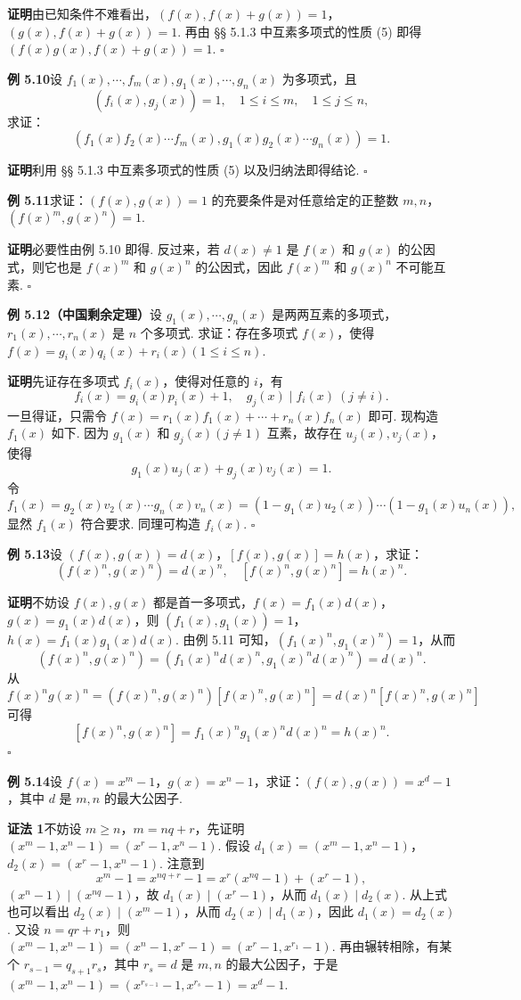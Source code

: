 \documentclass[UTF8,12pt,a4paper,fontset=fandol]{ctexart}
\begin{document}
\noindent\textbf{证明}\quad 由已知条件不难看出，$(f(x),f(x)+g(x))=1$，$(g(x),f(x)+g(x))=1$. 再由 §§ 5.1.3 中互素多项式的性质 (5) 即得 $(f(x)g(x),f(x)+g(x))=1$. \hfill $\square$

\noindent\textbf{例 5.10}\quad 设 $f_1(x),\cdots,f_m(x),g_1(x),\cdots,g_n(x)$ 为多项式，且
\[
(f_i(x),g_j(x))=1,\quad 1\le i\le m,\quad 1\le j\le n,
\]
求证：
\[
(f_1(x)f_2(x)\cdots f_m(x),g_1(x)g_2(x)\cdots g_n(x))=1.
\]

\noindent\textbf{证明}\quad 利用 §§ 5.1.3 中互素多项式的性质 (5) 以及归纳法即得结论. \hfill $\square$

\noindent\textbf{例 5.11}\quad 求证：$(f(x),g(x))=1$ 的充要条件是对任意给定的正整数 $m,n$，$(f(x)^m,g(x)^n)=1$.

\noindent\textbf{证明}\quad 必要性由例 5.10 即得. 反过来，若 $d(x)\ne1$ 是 $f(x)$ 和 $g(x)$ 的公因式，则它也是 $f(x)^m$ 和 $g(x)^n$ 的公因式，因此 $f(x)^m$ 和 $g(x)^n$ 不可能互素. \hfill $\square$

\noindent\textbf{例 5.12（中国剩余定理）}\quad 设 $g_1(x),\cdots,g_n(x)$ 是两两互素的多项式，$r_1(x),\cdots,r_n(x)$ 是 $n$ 个多项式. 求证：存在多项式 $f(x)$，使得 $f(x)=g_i(x)q_i(x)+r_i(x)(1\le i\le n)$.

\noindent\textbf{证明}\quad 先证存在多项式 $f_i(x)$，使得对任意的 $i$，有
\[
f_i(x)=g_i(x)p_i(x)+1,\quad g_j(x)\mid f_i(x)\ (j\ne i).
\]
一旦得证，只需令 $f(x)=r_1(x)f_1(x)+\cdots+r_n(x)f_n(x)$ 即可. 现构造 $f_1(x)$ 如下. 因为 $g_1(x)$ 和 $g_j(x)(j\ne1)$ 互素，故存在 $u_j(x),v_j(x)$，使得
\[
g_1(x)u_j(x)+g_j(x)v_j(x)=1.
\]
令
\[
f_1(x)=g_2(x)v_2(x)\cdots g_n(x)v_n(x)
=(1-g_1(x)u_2(x))\cdots(1-g_1(x)u_n(x)),
\]
显然 $f_1(x)$ 符合要求. 同理可构造 $f_i(x)$. \hfill $\square$

\noindent\textbf{例 5.13}\quad 设 $(f(x),g(x))=d(x)$，$[f(x),g(x)]=h(x)$，求证：
\[
(f(x)^n,g(x)^n)=d(x)^n,\quad [f(x)^n,g(x)^n]=h(x)^n.
\]

\noindent\textbf{证明}\quad 不妨设 $f(x),g(x)$ 都是首一多项式，$f(x)=f_1(x)d(x)$，$g(x)=g_1(x)d(x)$，则 $(f_1(x),g_1(x))=1$，$h(x)=f_1(x)g_1(x)d(x)$. 由例 5.11 可知，$(f_1(x)^n,g_1(x)^n)=1$，从而
\[
(f(x)^n,g(x)^n)=(f_1(x)^nd(x)^n,g_1(x)^nd(x)^n)=d(x)^n.
\]
从 $f(x)^ng(x)^n=(f(x)^n,g(x)^n)[f(x)^n,g(x)^n]=d(x)^n[f(x)^n,g(x)^n]$ 可得
\[
[f(x)^n,g(x)^n]=f_1(x)^ng_1(x)^nd(x)^n=h(x)^n.
\]
\hfill $\square$

\noindent\textbf{例 5.14}\quad 设 $f(x)=x^m-1$，$g(x)=x^n-1$，求证：$(f(x),g(x))=x^d-1$，其中 $d$ 是 $m,n$ 的最大公因子.

\noindent\textbf{证法 1}\quad 不妨设 $m\ge n$，$m=nq+r$，先证明 $(x^m-1,x^n-1)=(x^r-1,x^n-1)$. 假设 $d_1(x)=(x^m-1,x^n-1)$，$d_2(x)=(x^r-1,x^n-1)$. 注意到
\[
x^m-1=x^{nq+r}-1=x^r(x^{nq}-1)+(x^r-1),
\]
$(x^n-1)\mid (x^{nq}-1)$，故 $d_1(x)\mid (x^r-1)$，从而 $d_1(x)\mid d_2(x)$. 从上式也可以看出 $d_2(x)\mid (x^m-1)$，从而 $d_2(x)\mid d_1(x)$，因此 $d_1(x)=d_2(x)$. 又设 $n=qr+r_1$，则 $(x^m-1,x^n-1)=(x^n-1,x^r-1)=(x^r-1,x^{r_1}-1)$. 再由辗转相除，有某个 $r_{s-1}=q_{s+1}r_s$，其中 $r_s=d$ 是 $m,n$ 的最大公因子，于是 $(x^m-1,x^n-1)=(x^{r_{s-1}}-1,x^{r_s}-1)=x^d-1$.
\end{document}
